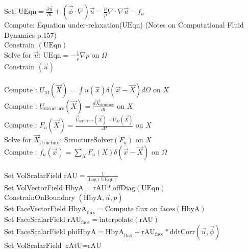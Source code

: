 \documentclass[10pt]{article} %
\begin{document}
\begin{algorithm}[H]
	\SetAlgoLined
	{
		{
			Set: $\text{UEqn} = \frac{\partial \vec{u}}{\partial t} + (\vec{\phi} \cdot \nabla) \vec{u} - \frac{\mu}{\rho} \nabla \cdot \nabla \vec{u} - f_u$\\
			Compute: Equation under-relaxation($\text{UEqn}$) (Notes on Computational Fluid Dynamics p.157)\\
			Constrain $(\text{UEqn})$\\
			Solve for $\vec{u}$: $\text{UEqn} = - \frac{1}{\rho} \nabla p $ \quad on $\Omega$\\
			Constrain $(\vec{u})$\\
			\quad \\
			Compute : $U_M (\vec{X}) = \int u(\vec{x}) \delta(\vec{x}-\vec{X}) d \Omega$ \quad on $X$\\
			Compute : $U_{\text{structure}} (\vec{X}) = \frac{d \vec{X}_{\text{structure}}}{dt}$ \quad on $X$\\
			Compute : $F_u (\vec{X}) = \frac{\vec{U}_\text{structure} (\vec{X}) - U_M(\vec{X})}{\Delta t}$ \quad on $X$\\
			Solve for $\vec{X}_\text{structure}$: $\text{StructureSolver}(F_u)$ \quad on $X$\\
			Compute : $f_u (\vec{x}) = \sum_{X} F_u (X) \delta (\vec{x}-\vec{X})$ \quad on $\Omega$\\
			\quad \\
			{
				Set VolScalarField $\text{rAU} =  \frac{1}{\text{diag}(\text{UEqn})}$\\
				Set VolVectorField $\text{HbyA} =  \text{rAU}*\text{offDiag}(\text{UEqn})$\\
				ConstrainOnBoundary $(\text{HbyA},\vec{u},p)$\\
				\quad Set FaceVectorField $\text{HbyA}_{\text{flux}} =  \text{Compute flux on faces}(\text{HbyA})$\\
				\quad Set FaceScalarField $\text{rAU}_{\text{face}} =  \text{interpolate}(\text{rAU})$\\
				Set FaceScalarField $\text{phiHbyA} = \text{HbyA}_{\text{flux}} + \text{rAU}_{\text{face}}*\text{ddtCorr}(\vec{u},\vec{\phi}) $\\
				Set VolScalarField $\text{rAtU} = \text{rAU}$\\
}}}
\end{algorithm}
\end{document}
